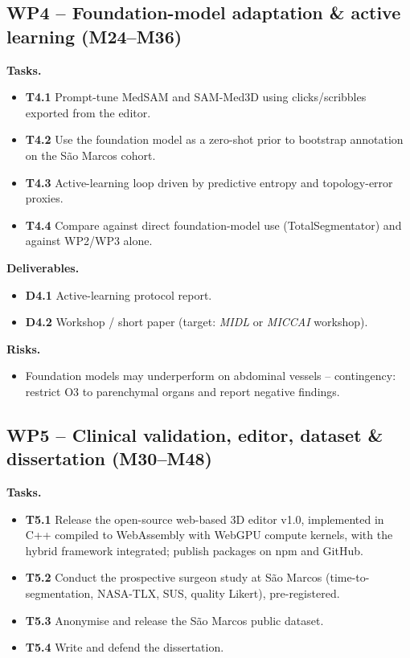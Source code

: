 \documentclass[a4paper,11pt,twoside]{article}
\begin{document}
\subsection{WP4 -- Foundation-model adaptation \& active learning (M24--M36)}

\textbf{Tasks.}
\begin{itemize}[noitemsep, topsep=3pt]
  \item \textbf{T4.1} Prompt-tune MedSAM and SAM-Med3D using clicks/scribbles
        exported from the editor.
  \item \textbf{T4.2} Use the foundation model as a zero-shot prior to bootstrap
        annotation on the S\~ao Marcos cohort.
  \item \textbf{T4.3} Active-learning loop driven by predictive entropy and
        topology-error proxies.
  \item \textbf{T4.4} Compare against direct foundation-model use
        (TotalSegmentator) and against WP2/WP3 alone.
\end{itemize}

\textbf{Deliverables.}
\begin{itemize}[noitemsep, topsep=3pt]
  \item \textbf{D4.1} Active-learning protocol report.
  \item \textbf{D4.2} Workshop / short paper (target: \textit{MIDL} or
        \textit{MICCAI} workshop).
\end{itemize}

\textbf{Risks.}
\begin{itemize}[noitemsep, topsep=3pt]
  \item Foundation models may underperform on abdominal vessels -- contingency:
        restrict O3 to parenchymal organs and report negative findings.
\end{itemize}

\subsection{WP5 -- Clinical validation, editor, dataset \& dissertation (M30--M48)}

\textbf{Tasks.}
\begin{itemize}[noitemsep, topsep=3pt]
  \item \textbf{T5.1} Release the open-source web-based 3D editor v1.0,
        implemented in C++ compiled to WebAssembly with WebGPU compute
        kernels, with the hybrid framework integrated; publish packages on
        npm and GitHub.
  \item \textbf{T5.2} Conduct the prospective surgeon study at S\~ao Marcos
        (time-to-segmentation, NASA-TLX, SUS, quality Likert), pre-registered.
  \item \textbf{T5.3} Anonymise and release the S\~ao Marcos public dataset.
  \item \textbf{T5.4} Write and defend the dissertation.
\end{itemize}
\end{document}
